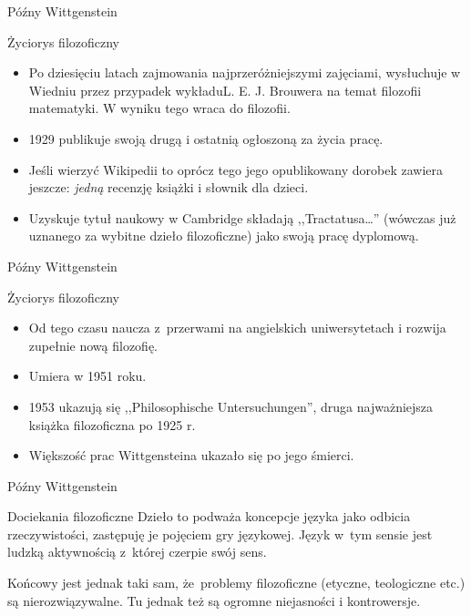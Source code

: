 \begin{frame}{Późny Wittgenstein}
\begin{block}{Życiorys filozoficzny}
\begin{itemize}
\item Po dziesięciu latach zajmowania najprzeróżniejszymi zajęciami, wysłuchuje w Wiedniu przez przypadek wykładu\linebreak L. E. J. Brouwera na temat filozofii matematyki. W wyniku tego wraca do filozofii.
\item 1929 publikuje swoją drugą i ostatnią ogłoszoną za życia pracę.
\item Jeśli wierzyć Wikipedii to oprócz tego jego opublikowany dorobek zawiera jeszcze: \emph{jedną} recenzję książki i słownik dla dzieci.
\item Uzyskuje tytuł naukowy w Cambridge składają ,,Tractatusa\ldots '' (wówczas już uznanego za wybitne dzieło filozoficzne) jako swoją pracę dyplomową.
\end{itemize}
\end{block}
\end{frame}

\begin{frame}{Późny Wittgenstein}
\begin{block}{Życiorys filozoficzny}
\begin{itemize}
\item Od tego czasu naucza z~przerwami na angielskich uniwersytetach i rozwija zupełnie nową filozofię.
\item Umiera w 1951 roku.
\item 1953 ukazują się ,,Philosophische Untersuchungen'', druga najważniejsza książka filozoficzna po 1925 r.
\item Większość prac Wittgensteina ukazało się po jego śmierci.
\end{itemize}
\end{block}
\end{frame}

\begin{frame}{Późny Wittgenstein}
\begin{block}{Dociekania filozoficzne}
Dzieło to podważa koncepcje języka jako odbicia rzeczywistości, zastępuję je pojęciem gry językowej. Język w~tym sensie jest ludzką aktywnością z~której czerpie swój sens.
\end{block}

\begin{block}{}
Końcowy jest jednak taki sam, że~problemy filozoficzne (etyczne, teologiczne etc.) są nierozwiązywalne. Tu jednak też są ogromne niejasności i kontrowersje.
\end{block}

\end{frame}

